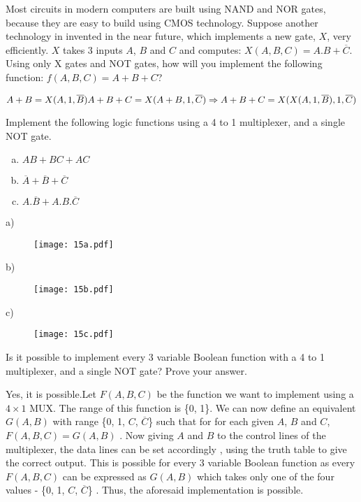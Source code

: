 \begin{ExerciseList}
\Exercise[difficulty=1]
Most circuits in modern computers are built using NAND and NOR gates, because
they are easy to build using CMOS technology.
Suppose another
technology in invented in the near future, 
which implements a new gate, $X$, very efficiently. $X$ takes 3
inputs $A$, $B$ and $C$ and computes:
 $X(A,B,C) = A.B + \overline C$.
Using only X gates and NOT gates, how will you implement the following function:
$f(A,B,C) = A+B+C$?


\Answer
$A+B = X(A,1,\overline B )\\
A+B+C = X(A+B, 1, \overline C )\\
\Rightarrow A+B+C = X(X(A,1,\overline B ),1,\overline C)$

\Exercise[difficulty = 2]
Implement the following logic functions using a 4 to 1 multiplexer, and a single
NOT gate.

\begin{enumerate}[(a) ]
\item
$AB + BC + AC$
\item
$\overline A + \overline B + \overline C$
\item
$A.\overline B + A.B.\overline C$
\end{enumerate}

\Answer 
a)\begin{figure}[H]
  \centering
  \texttt{[image: 15a.pdf]}
\end{figure}

b)\begin{figure}[H]
  \centering
  \texttt{[image: 15b.pdf]}
\end{figure}

c)\begin{figure}[H]
  \centering
  \texttt{[image: 15c.pdf]}
\end{figure}
\Exercise[difficulty=2]
Is it possible to implement every 3 variable Boolean function with a 4 to 1 multiplexer,
and a single NOT gate? Prove your answer.

\Answer
Yes, it is possible.Let $F(A,B,C)$ be the function we want to implement using a $4\times 1$
MUX. The range of this function is \{0, 1\}. We can now define an equivalent
$G(A,B)$ with range \{0, 1, $C$, $\overline C$\} such that for for each given
$A$, $B$ and $C$, $F(A,B,C) = G(A,B)$ . Now giving $A$ and $B$ to the control
lines of the multiplexer, the data lines can be set accordingly , using the truth table to give the correct output. This is possible for every 3 variable Boolean function as every $F(A,B,C)$ can be expressed as $G(A,B)$ which takes only one of the four values - \{0, 1, $C$, $\overline C$\} . Thus, the aforesaid implementation is possible.

\end{ExerciseList}

